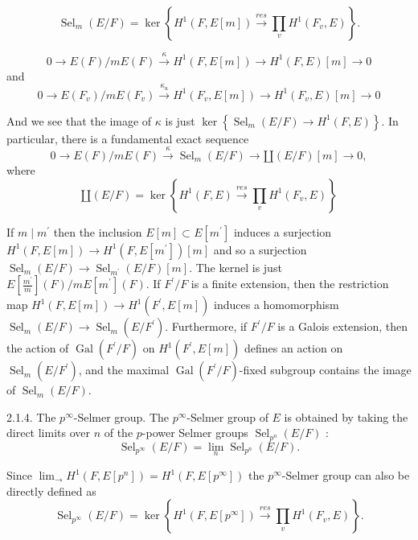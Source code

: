 \documentclass[leqno]{amsart}
\newcommand{\1}{\mathbf{1}}
\theoremstyle{definition}
\theoremstyle{remark}
\begin{document}
\[
\operatorname{Sel}_m(E / F)=\operatorname{ker}\left\{H^1(F, E[m]) \xrightarrow{r e s} \prod_v H^1\left(F_v, E\right)\right\} .
\]

\[
0 \rightarrow E(F) / m E(F) \xrightarrow{\kappa} H^1(F, E[m]) \rightarrow H^1(F, E)[m] \rightarrow 0
\]
and
\[
0 \rightarrow E\left(F_v\right) / m E\left(F_v\right) \xrightarrow{\kappa_u} H^1\left(F_v, E[m]\right) \rightarrow H^1\left(F_v, E\right)[m] \rightarrow 0
\]

And we see that the image of $\kappa$ is just $\operatorname{ker}\left\{\operatorname{Sel}_m(E / F) \rightarrow H^1(F, E)\right\}$. In particular, there is a fundamental exact sequence
\[
0 \rightarrow E(F) / m E(F) \xrightarrow{\kappa} \operatorname{Sel}_m(E / F) \rightarrow \amalg(E / F)[m] \rightarrow 0,
\]
where
\[
\amalg(E / F)=\operatorname{ker}\left\{H^1(F, E) \xrightarrow{r e s} \prod_v H^1\left(F_v, E\right)\right\}
\]

If $m \mid m^{\prime}$ then the inclusion $E[m] \subset E\left[m^{\prime}\right]$ induces a surjection $H^1(F, E[m]) \rightarrow H^1\left(F, E\left[m^{\prime}\right]\right)[m]$ and so a surjection $\operatorname{Sel}_m(E / F) \rightarrow \operatorname{Sel}_{m^{\prime}}(E / F)[m]$. The kernel is just $E\left[\frac{m^{\prime}}{m}\right](F) / m E\left[m^{\prime}\right](F)$. If $F^{\prime} / F$ is a finite extension, then the restriction map $H^1(F, E[m]) \rightarrow H^1\left(F^{\prime}, E[m]\right)$ induces a homomorphism $\operatorname{Sel}_m(E / F) \rightarrow \operatorname{Sel}_m\left(E / F^{\prime}\right)$. Furthermore, if $F^{\prime} / F$ is a Galois extension, then the action of $\operatorname{Gal}\left(F^{\prime} / F\right)$ on $H^1\left(F^{\prime}, E[m]\right)$ defines an action on $\operatorname{Sel}_m\left(E / F^{\prime}\right)$, and the maximal $\operatorname{Gal}\left(F^{\prime} / F\right)$-fixed subgroup contains the image of $\operatorname{Sel}_m(E / F)$.

2.1.4. The $p^{\infty}$-Selmer group. The $p^{\infty}$-Selmer group of $E$ is obtained by taking the direct limits over $n$ of the $p$-power Selmer groups $\operatorname{Sel}_{p^n}(E / F)$ :
\[
\operatorname{Sel}_{p^{\infty}}(E / F)=\underset{n}{\lim } \operatorname{Sel}_{p^n}(E / F) .
\]

Since $\lim _{\longrightarrow} H^1\left(F, E\left[p^n\right]\right)=H^1\left(F, E\left[p^{\infty}\right]\right)$ the $p^{\infty}$-Selmer group can also be directly defined as
\[
\operatorname{Sel}_{p^{\infty}}(E / F)=\operatorname{ker}\left\{H^1\left(F, E\left[p^{\infty}\right]\right) \xrightarrow{r e s} \prod_v H^1\left(F_v, E\right)\right\} .
\]
\end{document}
